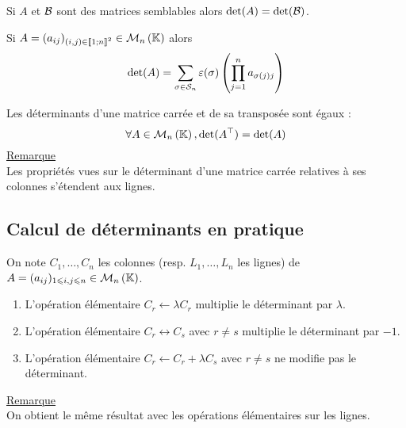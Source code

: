 \begin{defprop}
    Si \(A\) et \(\cal{B}\) sont des matrices semblables alors \(\det(A) = \det(\cal{B})\).
\end{defprop}
\begin{defprop}
    Si \(A = (a_{ij} )_{(i,j)\in \interventierii{1}{n}^2} \in \M{n}\) alors
    \[\det (A) = \sum_{\sigma \in \cal{S}_n} \epsilon (\sigma ) \paren{\prod^n_{j=1} a_{\sigma(j)j}}\]
\end{defprop}

\begin{defprop}
    Les déterminants d’une matrice carrée et de sa transposée sont égaux :
    \[\forall A \in  \M{n} , \det(\trans{A}) = \det(A)\]
    \underline{Remarque}\\
    Les propriétés vues sur le déterminant d’une matrice carrée relatives à ses colonnes s’étendent aux lignes.
\end{defprop}

\subsection{Calcul de déterminants en pratique}
    On note \(C_1, \dots  , C_n\) les colonnes (resp. \(L_1, \dots  , L_n\) les lignes) de \(A = (a_{ij} )_{1\leq i,j\leq n} \in  \M{n}\).
\begin{defprop}
    \begin{enumerate}
        \item L’opération élémentaire \(C_r \leftarrow \lambda C_r\) multiplie le déterminant par \(\lambda\).
        \item L’opération élémentaire \(C_r \leftrightarrow C_s\) avec \(r\neq s\) multiplie le déterminant par \(-1\).
        \item L’opération élémentaire \(C_r \leftarrow C_r + \lambda C_s\) avec \(r\neq s\) ne modifie pas le déterminant.
    \end{enumerate}
    \underline{Remarque}\\
    On obtient le même résultat avec les opérations élémentaires sur les lignes.
\end{defprop}

